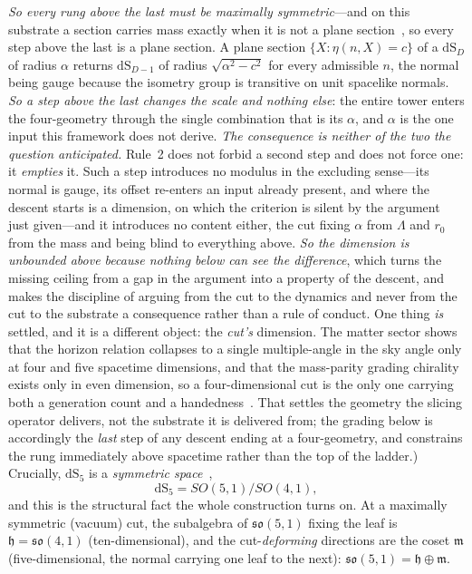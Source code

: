 \documentclass[11pt,a4paper]{article}
\theoremstyle{plain}
\theoremstyle{definition}
\theoremstyle{remark}
\newcommand{\so}{\mathfrak{so}}
\newcommand{\fh}{\mathfrak{h}}
\newcommand{\fm}{\mathfrak{m}}
\newcommand{\dS}{\mathrm{dS}}
\begin{document}
\emph{So every rung above the last must be maximally symmetric}---and on this substrate a
section carries mass exactly when it is not a plane section~\cite{JanzenGeometricCore}, so every step
above the last is a plane section. A plane section $\{X:\eta(n,X)=c\}$ of a $\dS_D$ of radius $\alpha$
returns $\dS_{D-1}$ of radius $\sqrt{\alpha^{2}-c^{2}}$ for every admissible $n$, the normal being
gauge because the isometry group is transitive on unit spacelike normals. \emph{So a step above the
last changes the scale and nothing else}: the entire tower enters the four-geometry through the single
combination that is its $\alpha$, and $\alpha$ is the one input this framework does not derive.
\emph{The consequence is neither of the two the question anticipated.} Rule~2 does not forbid a second
step and does not force one: it \emph{empties} it. Such a step introduces no modulus in the excluding
sense---its normal is gauge, its offset re-enters an input already present, and where the descent
starts is a dimension, on which the criterion is silent by the argument just given---and it introduces
no content either, the cut fixing $\alpha$ from $\Lambda$ and $r_{0}$ from the mass and being blind to
everything above. \emph{So the dimension is unbounded above because nothing below can see the
difference}, which turns the missing ceiling from a gap in the argument into a property of the
descent, and makes the discipline of arguing from the cut to the dynamics and never from the cut to
the substrate a consequence rather than a rule of conduct. One thing \emph{is} settled, and it is a different
object: the \emph{cut's} dimension. The matter sector shows that the horizon relation collapses to a single
multiple-angle in the sky angle only at four and five spacetime dimensions, and that the mass-parity grading
chirality exists only in even dimension, so a four-dimensional cut is the only one carrying both a generation
count and a handedness~\cite{JanzenSlicing,JanzenMatter}. That settles the geometry the slicing operator
delivers, not the substrate it is delivered from; the grading below is accordingly the \emph{last} step of any
descent ending at a four-geometry, and constrains the rung immediately above spacetime rather than the top of
the ladder.) Crucially, $\dS_5$ is a \emph{symmetric space}~\cite{Helgason1978},
\begin{equation}
\dS_5 = SO(5,1)/SO(4,1),
\end{equation}
and this is the structural fact the whole construction turns on. At a maximally symmetric (vacuum) cut, the subalgebra of $\so(5,1)$ fixing the leaf is $\fh=\so(4,1)$ (ten-dimensional), and the cut-\emph{deforming} directions are the coset $\fm$ (five-dimensional, the normal carrying one leaf to the next): $\so(5,1)=\fh\oplus\fm$.
\end{document}
